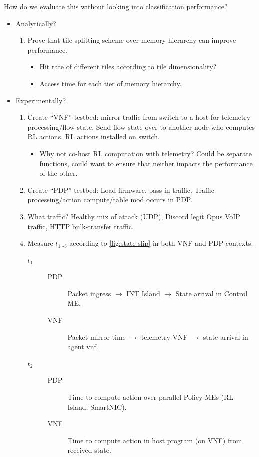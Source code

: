 \documentclass[sigconf,natbib=false]{acmart}
\begin{document}
How do we evaluate this without looking into classification performance?
\begin{itemize}
	\item Analytically?
	\begin{enumerate}
		\item Prove that tile splitting scheme over memory hierarchy can improve performance.
		\begin{itemize}
			\item Hit rate of different tiles according to tile dimensionality?
			\item Access time for each tier of memory hierarchy.
		\end{itemize}
	\end{enumerate}
	\item Experimentally?
	\begin{enumerate}
		\item Create ``VNF'' testbed: mirror traffic from switch to a host for telemetry processing/flow state. Send flow state over to another node who computes RL actions. RL actions installed on switch.
		\begin{itemize}
			\item Why not co-host RL computation with telemetry? Could be separate functions, could want to ensure that neither impacts the performance of the other.
		\end{itemize}
		\item Create ``PDP'' testbed: Load firmware, pass in traffic. Traffic processing/action compute/table mod occurs in PDP.
		\item What traffic? Healthy mix of attack (UDP), Discord legit Opus VoIP traffic, HTTP bulk-transfer traffic.
		\item Measure $t_{1 \cdots 3}$ according to \cref{fig:state-slip} in both VNF and PDP contexts.
		\begin{description}
			\item[$t_1$]
			\begin{description}
				\item[PDP] Packet ingress $\rightarrow$ INT Island $\rightarrow$ State arrival in Control ME.
				\item[VNF] Packet mirror time $\rightarrow$ telemetry VNF $\rightarrow$ state arrival in agent vnf.
			\end{description}
		
			\item[$t_2$]
			\begin{description}
				\item[PDP] Time to compute action over parallel Policy MEs (RL Island, SmartNIC).
				\item[VNF] Time to compute action in host program (on VNF) from received state.
			\end{description}
		

\end{description}
\end{enumerate}
\end{itemize}
\end{document}
